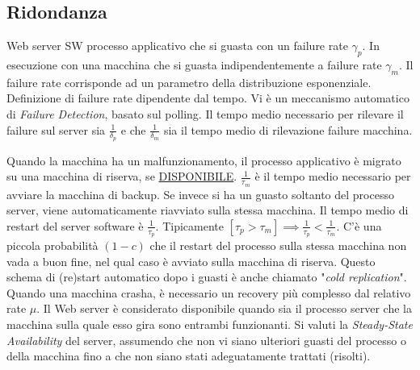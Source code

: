 \subsection{Ridondanza}

Web server SW processo applicativo che si guasta con un failure rate $\gamma_p$. In esecuzione con una macchina che si guasta indipendentemente a failure rate $\gamma_m$. Il failure rate corrisponde ad un parametro della distribuzione esponenziale. Definizione di failure rate dipendente dal tempo. Vi è un meccanismo automatico di \textit{Failure Detection}, basato sul polling. Il tempo medio necessario per rilevare il failure sul server sia $\frac{1}{\delta_p}$ e che $\frac{1}{\delta_m}$ sia il tempo medio di rilevazione failure macchina.

Quando la macchina ha un malfunzionamento, il processo applicativo è migrato su una macchina di riserva, se \underline{DISPONIBILE}. $\frac{1}{\tau_m}$ è il tempo medio necessario per avviare la macchina di backup. Se invece si ha un guasto soltanto del processo server, viene automaticamente riavviato sulla stessa macchina. Il tempo medio di restart del server software è $\frac{1}{\tau_p}$. Tipicamente $[\tau_p > \tau_m] \implies \frac{1}{\tau_p} < \frac{1}{\tau_m}$. C'è una piccola probabilità $(1-c)$ che il restart del processo sulla stessa macchina non vada a buon fine, nel qual caso è avviato sulla macchina di riserva. Questo schema di (re)start automatico dopo i guasti è anche chiamato "\textit{cold replication}". Quando una macchina crasha, è necessario un recovery più complesso dal relativo rate $\mu$. Il Web server è considerato disponibile quando sia il processo server che la macchina sulla quale esso gira sono entrambi funzionanti. Si valuti la \textit{Steady-State Availability} del server, assumendo che non vi siano ulteriori guasti del processo o della macchina fino a che non siano stati adeguatamente trattati (risolti).

